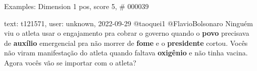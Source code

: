 \begin{frame}{Examples: Dimension 1 pos, score 5, \# 000039}
\footnotesize
\begin{exampleblock}{text: t121571, user: unknown, 2022-09-29}
@taoquei1 @FlavioBolsonaro Ninguém viu o atleta usar o engajamento pra cobrar o 
governo quando o \textbf{povo} precisava de \textbf{auxílio} emergencial pra 
não morrer de \textbf{fome} e o \textbf{presidente} cortou. Vocês não viram 
manifestação do atleta quando faltava \textbf{oxigênio} e não tinha vacina. 
Agora vocês vão se importar com o atleta? 
\end{exampleblock}
\end{frame}
